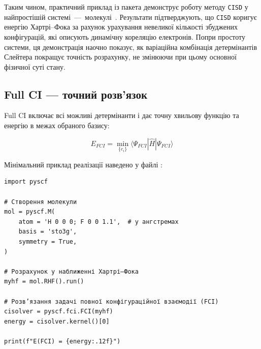 Таким чином, практичний приклад із пакета \PySCF{} демонструє роботу методу \texttt{CISD} у найпростішій системі~---~молекулі~.
Результати підтверджують, що \texttt{CISD} коригує енергію Хартрі–Фока за рахунок урахування невеликої кількості збуджених конфігурацій, які описують динамічну кореляцію електронів.
Попри простоту системи, ця демонстрація наочно показує, як варіаційна комбінація детермінантів Слейтера покращує точність розрахунку, не змінюючи при цьому основної фізичної суті стану.




\subsection{Full CI --- точний розв'язок}


Full CI включає всі можливі детермінанти і дає точну хвильову функцію та енергію в межах обраного базису:

\begin{equation}
    E_{FCI} = \min_{\{c_i\}} \langle \Psi_{FCI} | \hat{H} | \Psi_{FCI} \rangle
\end{equation}


Мінімальний приклад реалізації наведено у файлі :
\begin{verbatim}
import pyscf

# Створення молекули
mol = pyscf.M(
    atom = 'H 0 0 0; F 0 0 1.1',  # у ангстремах
    basis = 'sto3g',
    symmetry = True,
)

# Розрахунок у наближенні Хартрі–Фока
myhf = mol.RHF().run()

# Розв’язання задачі повної конфігураційної взаємодії (FCI)
cisolver = pyscf.fci.FCI(myhf)
energy = cisolver.kernel()[0]

print(f"E(FCI) = {energy:.12f}")
\end{verbatim}

